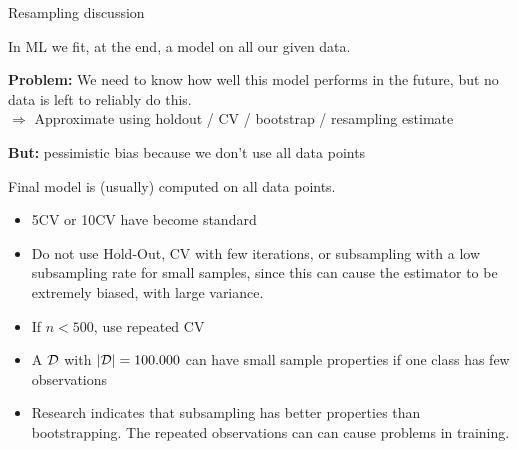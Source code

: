 \documentclass[11pt,compress,t,notes=noshow, xcolor=table]{beamer}
\begin{document}
% 

\begin{vbframe}{Resampling discussion}

In ML we fit, at the end, a model on all our given data.\\

\lz

\textbf{Problem:} We need to know how well this model performs in the future, 
but no data is left to reliably do this.\\

$\Rightarrow$ Approximate using holdout / CV / bootstrap / resampling estimate\\ 

\lz

\textbf{But:} pessimistic bias because we don't use all data points\\

\lz 

Final model is (usually) computed on all data points.


\framebreak

\begin{itemize}
  \item 5CV or 10CV have become standard
  \item Do not use Hold-Out, CV with few iterations, or subsampling with a low subsampling rate for small samples, since this can cause the estimator to be extremely biased, with large variance.
  \item If $n < 500$, use 
  repeated CV
  \item A $\mathcal{D}$ with $|\mathcal{D}| = 100.000$ can have small sample properties if one class has few observations 
  \item Research indicates that subsampling has better properties than
    bootstrapping. The repeated observations can can cause problems in training.
\end{itemize}
\end{vbframe}

\endlecture
\end{document}
